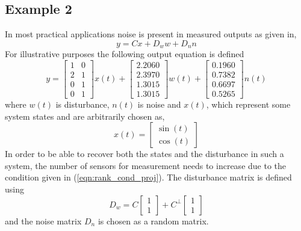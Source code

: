 \subsection{Example 2}
In most practical applications noise is present in measured outputs as given in,
\begin{equation}
    y=Cx+D_w w+D_n n\label{eqn:ex2_output_mapping1}
\end{equation}
For illustrative purposes the following output equation is defined
\begin{equation}
    y=\begin{bmatrix}
    1&     0\\
    2&     1\\
    0&     1\\
    0&     1
    \end{bmatrix}x(t)+\begin{bmatrix}
        2.2060\\
        2.3970\\
        1.3015\\
        1.3015
    \end{bmatrix}w(t)+
    \begin{bmatrix}
    0.1960\\
    0.7382\\
    0.6697\\
    0.5265
    \end{bmatrix}n(t)
\end{equation}
where $w(t)$ is disturbance, $n(t)$ is noise and $x(t)$, which represent some system states and  are arbitrarily chosen as,
\begin{equation}
    x(t)=\begin{bmatrix}
        \sin(t)\\ \cos(t)
    \end{bmatrix}
\end{equation}
In order to be able to recover both the states and the disturbance in such a system, the number of sensors for measurement needs to increase due to the condition given in (\ref{eqn:rank_cond_proj}).
The disturbance matrix is defined using 
\begin{equation}
    D_w=C\begin{bmatrix}1\\1\end{bmatrix}+C^\perp\begin{bmatrix}1\\1\end{bmatrix}
\end{equation}
and the noise matrix $D_n$ is chosen as a random matrix.

